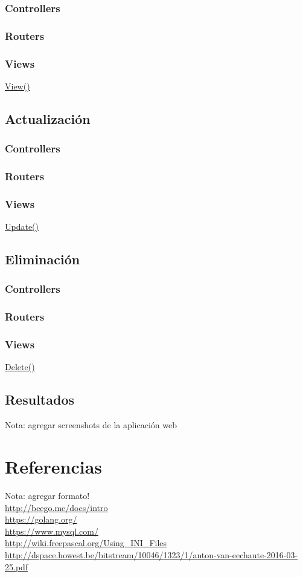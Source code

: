 \documentclass[12pt]{article}
\begin{document}
\subsubsection{Controllers}
\subsubsection{Routers}
\subsubsection{Views}
\href{https://github.com/Kihui/Beego-CRUD/blob/master/controllers/default.go\#L15}{View()}
\subsection{Actualización}
\subsubsection{Controllers}
\subsubsection{Routers}
\subsubsection{Views}
\href{https://github.com/Kihui/Beego-CRUD/blob/master/controllers/default.go\#L94}{Update()}
\subsection{Eliminación}
\subsubsection{Controllers}
\subsubsection{Routers}
\subsubsection{Views}
\href{https://github.com/Kihui/Beego-CRUD/blob/master/controllers/default.go\#L64}{Delete()}

\subsection{Resultados}
Nota: agregar screenshots de la aplicación web
\section{Referencias}
Nota: agregar formato!\\
\noindent
\url{http://beego.me/docs/intro} \\
\url{https://golang.org/}\\
\url{https://www.mysql.com/} \\
\url{http://wiki.freepascal.org/Using_INI_Files} \\
\url{http://dspace.howest.be/bitstream/10046/1323/1/anton-van-eechaute-2016-03-25.pdf}
\end{document}
